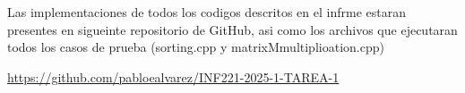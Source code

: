 Las implementaciones de todos los codigos descritos en el infrme estaran presentes en sigueinte repositorio de GitHub, asi como  los archivos que ejecutaran todos los casos de prueba (sorting.cpp y matrixMmultiplioation.cpp)

\begin{mdframed}
    \begin{center}
        {\Large \url{https://github.com/pabloealvarez/INF221-2025-1-TAREA-1}}
    \end{center}
\end{mdframed}


